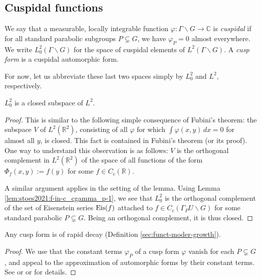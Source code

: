 \documentclass[reqno]{amsart} 
\begin{document}
\subsection{Cuspidal functions}

\begin{definition}
  We say that a measurable, locally integrable function $\varphi : \Gamma \backslash G \rightarrow \mathbb{C}$  is \emph{cuspidal} if for all standard parabolic subgroups $P \subsetneq G$, we have $\varphi_P = 0$ almost everywhere.  We write $L^2_0(\Gamma \backslash G)$ for the space of cuspidal elements of $L^2(\Gamma \backslash G)$.  A \emph{cusp form} is a cuspidal automorphic form.
\end{definition}

For now, let us abbreviate these last two spaces simply by $L^2_0$ and $L^2$, respectively.
\begin{lemma}
  $L^2_0$ is a closed subspace of $L^2$.
\end{lemma}
\begin{proof}
  This is similar to the following simple consequence of Fubini's theorem: the subspace $V$ of $L^2(\mathbb{R}^2)$, consisting of all $\varphi$ for which $\int \varphi(x,y) \, d x = 0$ for almost all $y$, is closed.  This fact is contained in Fubini's theorem (or its proof).  One way to understand this observation is as follows: $V$ is the orthogonal complement in $L^2(\mathbb{R}^2)$ of the space of all functions of the form $\Phi_f(x,y) := f(y)$ for some $f \in C_c(\mathbb{R})$.

  A similar argument applies in the setting of the lemma.  Using Lemma \ref{lem:stoes2021:f-in-c_cgamma_p-1}, we see that $L^2_0$ is the orthogonal complement of the set of Eisenstein series $\operatorname{Eis}(f)$ attached to $f \in C_c(\Gamma_P U \backslash G)$ for some standard parabolic $P \subsetneq G$.  Being an orthogonal complement, it is thus closed.
\end{proof}

\begin{lemma}
  Any cusp form is of rapid decay (Definition \ref{sec:funct-moder-growth}).
\end{lemma}
\begin{proof}
  We use that the constant terms $\varphi_P$ of a cusp form $\varphi$ vanish for each $P \subsetneq G$, and appeal to the approximation of automorphic forms by their constant terms.  See \cite[Cor 7.9]{MR1482800} or \cite[Thm 6.9]{MR2331343} or  \cite[I.2.12, I.2.18]{MR1361168} for details.
\end{proof}
\end{document}

